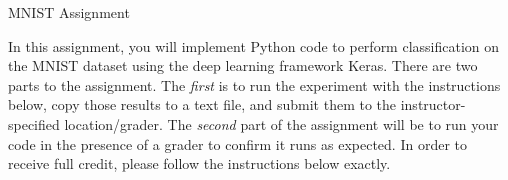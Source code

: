\documentclass[12pt]{article}
\theoremstyle{plain}
\theoremstyle{definition}
\begin{document}
\begin{center}
\begin{Large} 
MNIST Assignment\\
\end{Large}
\end{center}

In this assignment, you will implement Python code to perform classification on the MNIST dataset using the deep learning framework Keras. There are two parts to the assignment. The \textit{first} is to run the experiment with the instructions below, copy those results to a text file, and submit them to the instructor-specified location/grader. The \textit{second} part of the assignment will be to run your code in the presence of a grader to confirm it runs as expected. In order to receive full credit, please follow the instructions below exactly.
\end{document}
